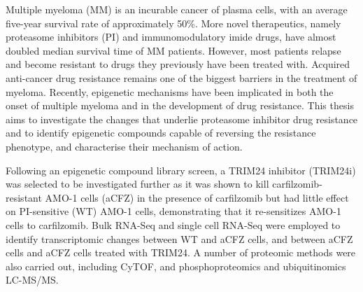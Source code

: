 
Multiple myeloma (MM) is an incurable cancer of plasma cells, with an average five-year survival rate of approximately 50\%.
More novel therapeutics, namely proteasome inhibitors (PI) and immunomodulatory imide drugs, have almost doubled median survival time of MM patients.
However, most patients relapse and become resistant to drugs they previously have been treated with.
Acquired anti-cancer drug resistance remains one of the biggest barriers in the treatment of myeloma.
Recently, epigenetic mechanisms have been implicated in both the onset of multiple myeloma and in the development of drug resistance.
This thesis aims to investigate the changes that underlie proteasome inhibitor drug resistance and to identify epigenetic compounds capable of reversing the resistance phenotype, and characterise their mechanism of action.

Following an epigenetic compound library screen, a TRIM24 inhibitor (TRIM24i) was selected to be investigated further as it was shown to kill carfilzomib-resistant AMO-1 cells (aCFZ) in the presence of carfilzomib but had little effect on PI-sensitive (WT) AMO-1 cells, demonstrating that it re-sensitizes AMO-1 cells to carfilzomib.
Bulk RNA-Seq and single cell RNA-Seq were employed to identify transcriptomic changes between WT and aCFZ cells, and between aCFZ cells and aCFZ cells treated with TRIM24. A number of proteomic methods were also carried out, including CyTOF, and phosphoproteomics and ubiquitinomics LC-MS/MS.
